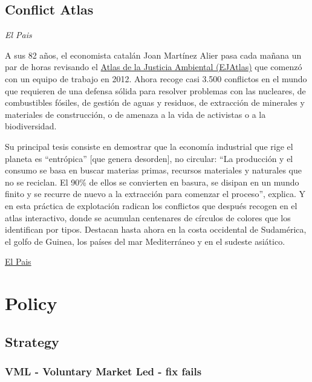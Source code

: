 \documentclass[
]{book}
\begin{document}
\hypertarget{conflict-atlas}{%
\section{Conflict Atlas}\label{conflict-atlas}}

\emph{El Pais}

A sus 82 años, el economista catalán Joan Martínez Alier pasa cada mañana un par de horas revisando el \href{https://ejatlas.org/?translate=es}{Atlas de la Justicia Ambiental (EJAtlas)} que comenzó con un equipo de trabajo en 2012. Ahora recoge casi 3.500 conflictos en el mundo que requieren de una defensa sólida para resolver problemas con las nucleares, de combustibles fósiles, de gestión de aguas y residuos, de extracción de minerales y materiales de construcción, o de amenaza a la vida de activistas o a la biodiversidad.

Su principal tesis consiste en demostrar que la economía industrial que rige el planeta es ``entrópica'' {[}que genera desorden{]}, no circular: ``La producción y el consumo se basa en buscar materias primas, recursos materiales y naturales que no se reciclan. El 90\% de ellos se convierten en basura, se disipan en un mundo finito y se recurre de nuevo a la extracción para comenzar el proceso'', explica. Y en esta práctica de explotación radican los conflictos que después recogen en el atlas interactivo, donde se acumulan centenares de círculos de colores que los identifican por tipos. Destacan hasta ahora en la costa occidental de Sudamérica, el golfo de Guinea, los países del mar Mediterráneo y en el sudeste asiático.

\href{https://elpais.com/clima-y-medio-ambiente/2021-07-09/los-conflictos-ambientales-no-son-anecdoticos-son-sistemicos.html}{El Pais}

\hypertarget{policy}{%
\chapter{Policy}\label{policy}}

\hypertarget{strategy}{%
\section{Strategy}\label{strategy}}

\hypertarget{vml---voluntary-market-led---fix-fails}{%
\subsection{VML - Voluntary Market Led - fix fails}\label{vml---voluntary-market-led---fix-fails}}
\end{document}
